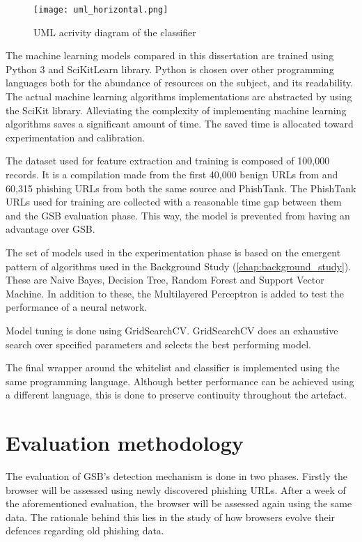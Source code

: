 \begin{figure}[!t]
	\centering
	\texttt{[image: uml\_horizontal.png]}
	\caption{UML acrivity diagram of the classifier}
	\label{fig:UML}
\end{figure}

The machine learning models compared in this dissertation are trained using Python 3 and SciKitLearn \citep{Pedregosa} library. Python is chosen over other programming languages both for the abundance of resources on the subject, and its readability. The actual machine learning algorithms implementations are abstracted by using the SciKit library. Alleviating the complexity of implementing machine learning algorithms saves a significant amount of time. The saved time is allocated toward experimentation and calibration.

The dataset used for feature extraction and training is composed of 100,000 records. It is a compilation made from the first 40,000 benign URLs from \cite{Kumar_Siddharth} and 60,315 phishing URLs from both the same source and PhishTank. The PhishTank URLs used for training are collected with a reasonable time gap between them and the GSB evaluation phase. This way, the model is prevented from having an advantage over GSB.

The set of models used in the experimentation phase is based on the emergent pattern of algorithms used in the Background Study (\ref{chap:background_study}). These are Naive Bayes, Decision Tree, Random Forest and Support Vector Machine. In addition to these, the Multilayered Perceptron is added to test the performance of a neural network.

Model tuning is done using GridSearchCV. GridSearchCV does an exhaustive search over specified parameters and selects the best performing model.

The final wrapper around the whitelist and classifier is implemented using the same programming language. Although better performance can be achieved using a different language, this is done to preserve continuity throughout the artefact.

\section{Evaluation methodology}
The evaluation of GSB's detection mechanism is done in two phases. Firstly the browser will be assessed using newly discovered phishing URLs. After a week of the aforementioned evaluation, the browser will be assessed again using the same data. The rationale behind this lies in the study of how browsers evolve their defences regarding old phishing data.

